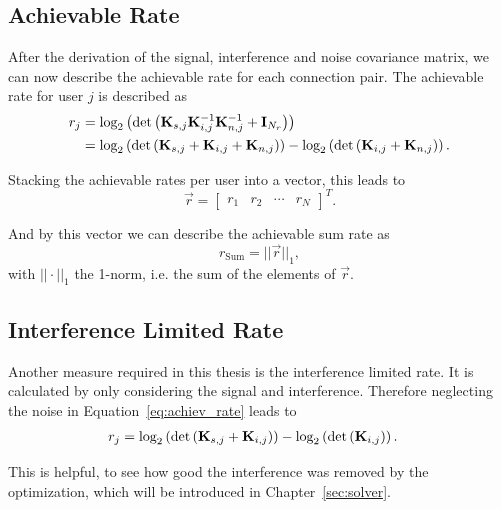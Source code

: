 \subsection{Achievable Rate}
\label{sec:achiev_rate}
After the derivation of the signal, interference and noise covariance matrix, we can now describe the achievable rate for each connection pair.
The achievable rate for user $j$ is described as
\begin{align}
\label{eq:achiev_rate}
\nonumber
r_j &= \text{log}_2\left(\text{det}\left(\mathbf{K}_{s,j}\mathbf{K}_{i,j}^{-1}\mathbf{K}_{n,j}^{-1}+\mathbf{I}_{N_r}\right)\right)\\
 &=\text{log}_2\left(\text{det}\left(\mathbf{K}_{s,j}+\mathbf{K}_{i,j}+\mathbf{K}_{n,j}\right)\right) -
	     	\text{log}_2\left(\text{det}\left(\mathbf{K}_{i,j}+\mathbf{K}_{n,j}\right)\right).
\end{align}

Stacking the achievable rates per user into a vector, this leads to 
\begin{equation}
\label{eq:achiev_vec}
\vec{r} =
\begin{bmatrix}
r_1 & r_2 & \cdots & r_N
\end{bmatrix}^T.
\end{equation}

And by this vector we can describe the achievable sum rate as
\begin{equation}
\label{eq:achiev_sum_rate}
r_{\text{Sum}} = ||\vec{r}||_1,
\end{equation}
with $||\cdot||_1$ the 1-norm, i.e. the sum of the elements of $\vec{r}$.

\subsection{Interference Limited Rate}
\label{sec:sir_rate}
Another measure required in this thesis is the interference limited rate.
It is calculated by only considering the signal and interference.
Therefore neglecting the noise in Equation~\ref{eq:achiev_rate} leads to
\begin{align}
\label{eq:sir_rate}
r_j &=\text{log}_2\left(\text{det}\left(\mathbf{K}_{s,j}+\mathbf{K}_{i,j}\right)\right) -
	     	\text{log}_2\left(\text{det}\left(\mathbf{K}_{i,j}\right)\right).
\end{align}

This is helpful, to see how good the interference was removed by the optimization, which will be introduced in Chapter~\ref{sec:solver}.



